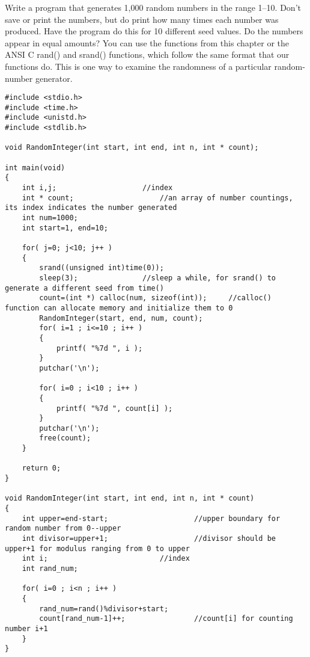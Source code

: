 \begin{question}
Write a program that generates 1,000 random numbers in the range 1–10. Don’t save or
print the numbers, but do print how many times each number was produced. Have the
program do this for 10 different seed values. Do the numbers appear in equal amounts?
You can use the functions from this chapter or the ANSI C rand() and srand()
functions, which follow the same format that our functions do. This is one way to
examine the randomness of a particular random-number generator.
\end{question}
\begin{solution}
  \begin{verbatim}
#include <stdio.h>
#include <time.h>
#include <unistd.h>
#include <stdlib.h>

void RandomInteger(int start, int end, int n, int * count);

int main(void)
{
	int i,j;					//index
	int * count;					//an array of number countings, its index indicates the number generated
	int num=1000;
	int start=1, end=10;

	for( j=0; j<10; j++ )
	{
		srand((unsigned int)time(0));			
		sleep(3);				//sleep a while, for srand() to generate a different seed from time()
		count=(int *) calloc(num, sizeof(int));		//calloc() function can allocate memory and initialize them to 0
		RandomInteger(start, end, num, count);	
		for( i=1 ; i<=10 ; i++ )
		{
			printf( "%7d ", i );
		}
		putchar('\n');

		for( i=0 ; i<10 ; i++ )			
		{
			printf( "%7d ", count[i] );
		}
		putchar('\n');
		free(count);					
	}

	return 0;
}

void RandomInteger(int start, int end, int n, int * count)
{
	int upper=end-start;					//upper boundary for random number from 0--upper
	int divisor=upper+1;					//divisor should be upper+1 for modulus ranging from 0 to upper
	int i;							//index
	int rand_num;

	for( i=0 ; i<n ; i++ )
	{
		rand_num=rand()%divisor+start;			
		count[rand_num-1]++;				//count[i] for counting number i+1
	}
}
  \end{verbatim}
\end{solution}

